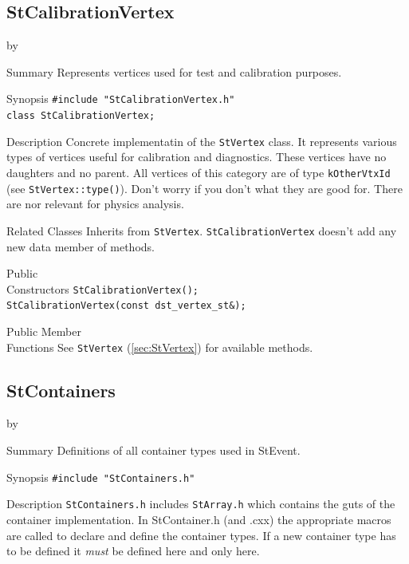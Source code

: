 \documentclass[twoside]{article}
\newcommand{\StEvent}{\textsf{StEvent}}
\newcommand{\entrylabel}[1]{\mbox{\textbf{{#1}}}\hfil}%
\newenvironment{entry}
{\begin{list}{}%
    {\renewcommand{\makelabel}{\entrylabel}%
     \setlength{\labelwidth}{90pt}%
     \setlength{\leftmargin}{\labelwidth}
     \advance\leftmargin by \labelsep%
      }%
    }%
  {\end{list}}
\newcommand{\Entrylabel}[1]%
{\raisebox{0pt}[1ex][0pt]{\makebox[\labelwidth][l]%
    {\parbox[t]{\labelwidth}{\hspace{0pt}\textbf{{#1}}}}}}
\newenvironment{Entry}%
{\renewcommand{\entrylabel}{\Entrylabel}\begin{entry}}%
  {\end{entry}}
\begin{document}
\subsection{StCalibrationVertex}
\label{sec:StCalibrationVertex}
\begin{Entry}
\item[Summary]
    Represents vertices used for test and calibration purposes.
    
\item[Synopsis]
    \verb+#include "StCalibrationVertex.h"+\\
    \verb+class StCalibrationVertex;+\\
    
\item[Description]
    Concrete implementatin of the \texttt{StVertex} class.
    It represents various types of vertices useful for calibration and
    diagnostics. These vertices have no daughters and no parent.  All
    vertices of this category are of type \texttt{kOtherVtxId} (see
    \texttt{StVertex::type()}).  Don't worry if you don't what they
    are good for.  There are nor relevant for physics analysis.
    
\item[Related Classes]
    Inherits from \texttt{StVertex}. \texttt{StCalibrationVertex} doesn't add
    any new data member of methods. 
    
\item[Public\\ Constructors]
    \verb+StCalibrationVertex();+\\
    \verb+StCalibrationVertex(const dst_vertex_st&);+\\
    
\item[Public Member\\ Functions]
    See \texttt{StVertex} (\ref{sec:StVertex}) for available methods.
\end{Entry}
\clearpage

\subsection{StContainers}
\label{sec:StContainers}
\begin{Entry}
\item[Summary] Definitions of all container types used in \StEvent.
\item[Synopsis]
    \verb+#include "StContainers.h"+\\
\item[Description] \texttt{StContainers.h} includes \texttt{StArray.h}
    which contains the guts of the container implementation. In
    StContainer.h (and .cxx) the appropriate macros are called to
    declare and define the container types. If a new container type
    has to be defined it \emph{must} be defined here and only here.
\end{Entry}
\clearpage
\end{document}
